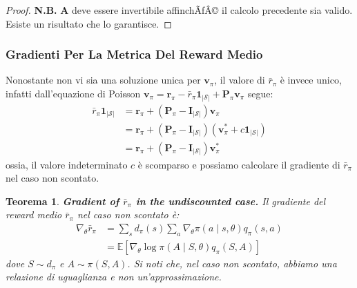 ﻿\documentclass[11pt, a4paper]{report}
\newtheorem{theorem}{Teorema}
\begin{document}
\begin{proof}
\textbf{N.B.} $\bm{A}$ deve essere invertibile affinchÃƒÂ© il calcolo precedente sia valido. Esiste un risultato che lo garantisce.
\end{proof}

\subsubsection{Gradienti Per La Metrica Del Reward Medio}
Nonostante non vi sia una soluzione unica per $\bm{v}_{\pi}$, il valore di $\bar{r}_{\pi}$ è invece unico, infatti dall'equazione di Poisson $\bm{v}_{\pi} = \bm{r}_{\pi} - \bar{r}_{\pi} \bm{1}_{|\mathcal{S}|} + \bm{P}_{\pi} \bm{v}_{\pi}$ segue:
\begin{align*}
\bar{r}_{\pi} \bm{1}_{|\mathcal{S}|} &= \bm{r}_{\pi} + (\bm{P}_{\pi} - \bm{I}_{|\mathcal{S}|}) \bm{v}_{\pi} \\
&= \bm{r}_{\pi} + (\bm{P}_{\pi} - \bm{I}_{|\mathcal{S}|}) (\bm{v}_{\pi}^* + c \bm{1}_{|\mathcal{S}|}) \\
&= \bm{r}_{\pi} + (\bm{P}_{\pi} - \bm{I}_{|\mathcal{S}|}) \bm{v}_{\pi}^*
\end{align*}
ossia, il valore indeterminato $c$ è scomparso e possiamo calcolare il gradiente di $\bar{r}_{\pi}$ nel caso non scontato.

\begin{center}
\end{center}

\begin{theorem}
\textbf{Gradient of $\bar{r}_{\pi}$ in the undiscounted case.} Il gradiente del \emph{reward} medio $\bar{r}_{\pi}$ nel caso non scontato è:
\begin{align*}
\nabla_{\theta} \bar{r}_{\pi} &= \sum_s d_{\pi}(s) \sum_a \nabla_{\theta} \pi(a \mid s, \theta) q_{\pi}(s, a) \\
&= \mathbb{E} [\nabla_{\theta} \log \pi(A \mid S, \theta) q_{\pi}(S, A)]
\end{align*}
dove $S \sim d_{\pi}$ e $A \sim \pi(S, A)$. Si noti che, nel caso non scontato, abbiamo una relazione di uguaglianza e non un'approssimazione.
\end{theorem}
\end{document}
